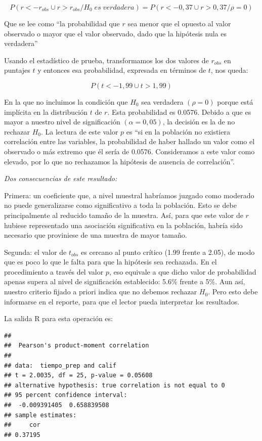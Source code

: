 \documentclass[]{book}
\begin{document}
\[P( r < -r_{obs} \cup r > r_{obs} / H_0 \; es \; verdadera) = P(r < -0,37 \cup r > 0,37/ \rho = 0)\]

Que se lee como ``la probabilidad que \(r\) sea menor que el opuesto al
valor observado o mayor que el valor observado, dado que la hipótesis
nula es verdadera''

Usando el estadístico de prueba, transformamos los dos valores de
\(r_{obs}\) en puntajes \(t\) y entonces esa probabilidad, expresada en
términos de \(t\), nos queda:

\[P(t < - 1,99 \cup t > 1,99)\]

En la que no incluimos la condición que \(H_0\) sea verdadera
\((\rho = 0)\) porque está implícita en la distribución \(t\)
de \(r\). Esta probabilidad es 0.0576. Debido a que es mayor a nuestro nivel de significación
\((\alpha = 0,05)\), la decisión es la de no rechazar \(H_0\).
La lectura de este valor \(p\) es ``si en la población no existiera
correlación entre las variables, la probabilidad de haber hallado un
valor como el observado o más extremo que él sería de 0.0576.
Consideramos a este valor como elevado, por lo que no rechazamos la
hipótesis de ausencia de correlación''.

\emph{Dos consecuencias de este resultado:}

Primera: un coeficiente que, a nivel muestral habríamos juzgado como
moderado no puede generalizarse como significativo a toda la población.
Esto se debe principalmente al reducido tamaño de la muestra. Así, para
que este valor de \(r\) hubiese representado una asociación significativa
en la población, habría sido necesario que proviniese de una muestra de
mayor tamaño.

Segunda: el valor de \(t_{obs}\) es cercano al punto crítico (1.99 frente a 2.05), de modo que es poco lo que le falta para que la hipótesis sea
rechazada. En el procedimiento a través del valor \(p\), eso equivale a
que dicho valor de probabilidad apenas supera al nivel de significación
establecido: 5.6\% frente a 5\%. Aun así, nuestro criterio fijado a priori indica que no debemos rechazar \(H_0\). Pero esto debe informarse en el reporte, para que el lector pueda interpretar los resultados.

La salida R para esta operación es:

\begin{verbatim}
## 
##  Pearson's product-moment correlation
## 
## data:  tiempo_prep and calif
## t = 2.0035, df = 25, p-value = 0.05608
## alternative hypothesis: true correlation is not equal to 0
## 95 percent confidence interval:
##  -0.009391405  0.658839508
## sample estimates:
##     cor 
## 0.37195
\end{verbatim}
\end{document}
